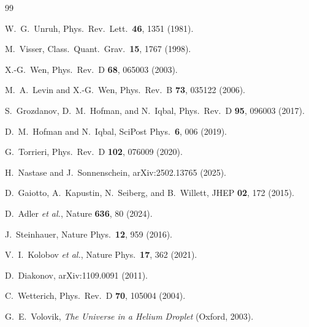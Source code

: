 \documentclass[aps,prl,twocolumn,superscriptaddress,showpacs]{revtex4-2}
\begin{document}
\begin{thebibliography}{99}

W.~G.~Unruh, Phys.\ Rev.\ Lett.\ \textbf{46}, 1351 (1981).

M.~Visser, Class.\ Quant.\ Grav.\ \textbf{15}, 1767 (1998).

X.-G.~Wen, Phys.\ Rev.\ D \textbf{68}, 065003 (2003).

M.~A.~Levin and X.-G.~Wen, Phys.\ Rev.\ B \textbf{73}, 035122 (2006).

S.~Grozdanov, D.~M.~Hofman, and N.~Iqbal, Phys.\ Rev.\ D \textbf{95}, 096003 (2017).

D.~M.~Hofman and N.~Iqbal, SciPost Phys.\ \textbf{6}, 006 (2019).


G.~Torrieri, Phys.\ Rev.\ D \textbf{102}, 076009 (2020).

H.~Nastase and J.~Sonnenschein, arXiv:2502.13765 (2025).

D.~Gaiotto, A.~Kapustin, N.~Seiberg, and B.~Willett, JHEP \textbf{02}, 172 (2015).

D.~Adler \textit{et al.}, Nature \textbf{636}, 80 (2024).

J.~Steinhauer, Nature Phys.\ \textbf{12}, 959 (2016).

V.~I.~Kolobov \textit{et al.}, Nature Phys.\ \textbf{17}, 362 (2021).

D.~Diakonov, arXiv:1109.0091 (2011).

C.~Wetterich, Phys.\ Rev.\ D \textbf{70}, 105004 (2004).

G.~E.~Volovik, \textit{The Universe in a Helium Droplet} (Oxford, 2003).

\end{thebibliography}
\end{document}
